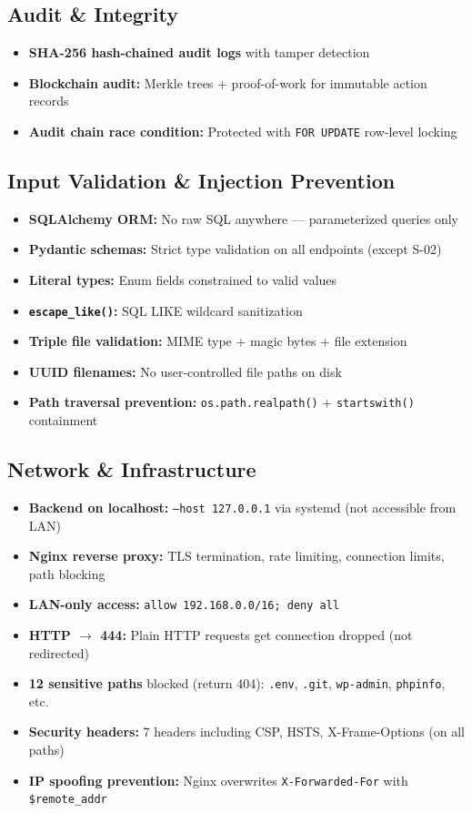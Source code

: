 \documentclass[11pt,a4paper]{article}
\begin{document}
\subsection{Audit \& Integrity}
\begin{itemize}[nosep]
  \item \textbf{SHA-256 hash-chained audit logs} with tamper detection
  \item \textbf{Blockchain audit:} Merkle trees + proof-of-work for immutable action records
  \item \textbf{Audit chain race condition:} Protected with \texttt{FOR UPDATE} row-level locking
\end{itemize}

\subsection{Input Validation \& Injection Prevention}
\begin{itemize}[nosep]
  \item \textbf{SQLAlchemy ORM:} No raw SQL anywhere --- parameterized queries only
  \item \textbf{Pydantic schemas:} Strict type validation on all endpoints (except S-02)
  \item \textbf{Literal types:} Enum fields constrained to valid values
  \item \textbf{\texttt{escape\_like()}:} SQL LIKE wildcard sanitization
  \item \textbf{Triple file validation:} MIME type + magic bytes + file extension
  \item \textbf{UUID filenames:} No user-controlled file paths on disk
  \item \textbf{Path traversal prevention:} \texttt{os.path.realpath()} + \texttt{startswith()} containment
\end{itemize}

\subsection{Network \& Infrastructure}
\begin{itemize}[nosep]
  \item \textbf{Backend on localhost:} \texttt{--host 127.0.0.1} via systemd (not accessible from LAN)
  \item \textbf{Nginx reverse proxy:} TLS termination, rate limiting, connection limits, path blocking
  \item \textbf{LAN-only access:} \texttt{allow 192.168.0.0/16; deny all}
  \item \textbf{HTTP $\rightarrow$ 444:} Plain HTTP requests get connection dropped (not redirected)
  \item \textbf{12 sensitive paths} blocked (return 404): \texttt{.env}, \texttt{.git}, \texttt{wp-admin}, \texttt{phpinfo}, etc.
  \item \textbf{Security headers:} 7 headers including CSP, HSTS, X-Frame-Options (on all paths)
  \item \textbf{IP spoofing prevention:} Nginx overwrites \texttt{X-Forwarded-For} with \texttt{\$remote\_addr}
\end{itemize}
\end{document}
